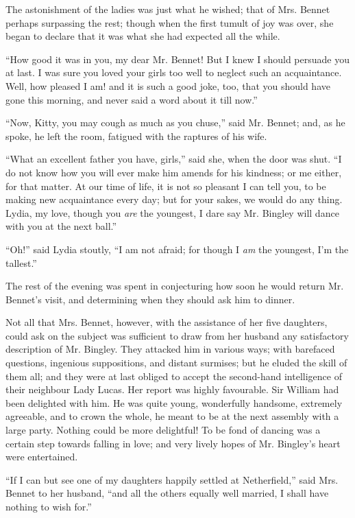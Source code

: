 The astonishment of the ladies was just what he wished;
that of Mrs. Bennet perhaps surpassing the rest; though
when the first tumult of joy was over, she began to declare
that it was what she had expected all the while.

“How good it was in you, my dear Mr. Bennet! But
I knew I should persuade you at last. I was sure you
loved your girls too well to neglect such an acquaintance.
Well, how pleased I am! and it is such a good joke, too,
that you should have gone this morning, and never said
a word about it till now.”

“Now, Kitty, you may cough as much as you chuse,”
said Mr. Bennet; and, as he spoke, he left the room,
fatigued with the raptures of his wife.

“What an excellent father you have, girls,” said she,
when the door was shut. “I do not know how you will
ever make him amends for his kindness; or me either,
for that matter. At our time of life, it is not so pleasant
I can tell you, to be making new acquaintance every day;
but for your sakes, we would do any thing. Lydia, my
love, though you \textit{are} the youngest, I dare say Mr. Bingley
will dance with you at the next ball.”

“Oh!” said Lydia stoutly, “I am not afraid; for
though I \textit{am} the youngest, I’m the tallest.”

The rest of the evening was spent in conjecturing how
soon he would return Mr. Bennet’s visit, and determining
when they should ask him to dinner.


Not all that Mrs. Bennet, however, with the assistance
of her five daughters, could ask on the subject was sufficient
to draw from her husband any satisfactory description
of Mr. Bingley. They attacked him in various ways;
with barefaced questions, ingenious suppositions, and
distant surmises; but he eluded the skill of them all;
and they were at last obliged to accept the second-hand
intelligence of their neighbour Lady Lucas. Her report
was highly favourable. Sir William had been delighted
with him. He was quite young, wonderfully handsome,
extremely agreeable, and to crown the whole, he meant to
be at the next assembly with a large party. Nothing
could be more delightful! To be fond of dancing was
a certain step towards falling in love; and very lively
hopes of Mr. Bingley’s heart were entertained.

“If I can but see one of my daughters happily settled
at Netherfield,” said Mrs. Bennet to her husband, “and
all the others equally well married, I shall have nothing
to wish for.”

